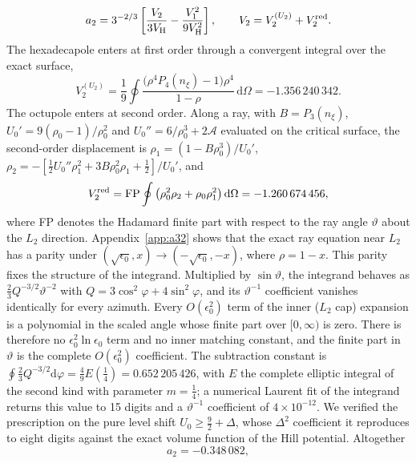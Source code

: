 \documentclass[twocolumn]{aastex702}
\newcommand{\dd}{\mathrm{d}}
\begin{document}
\begin{equation}
a_2=3^{-2/3}\left[\frac{V_2}{3V_{\rm H}}-\frac{V_1^2}{9V_{\rm H}^2}\right],\qquad V_2=V_2^{(U_2)}+V_2^{\rm red}.
\label{eq:a2}
\end{equation}
The hexadecapole enters at first order through a convergent integral over the exact surface,
\begin{equation}
V_2^{(U_2)}=\frac19\oint\frac{\big(\rho^4P_4(n_\xi)-1\big)\rho^4}{1-\rho}\,\dd\Omega=-1.356\,240\,342.
\end{equation}
The octupole enters at second order. Along a ray, with $B=P_3(n_\xi)$, $U_0'=9(\rho_0-1)/\rho_0^2$ and $U_0''=6/\rho_0^3+2\mathcal A$ evaluated on the critical surface, the second-order displacement is $\rho_1=(1-B\rho_0^3)/U_0'$, $\rho_2=-[\tfrac12U_0''\rho_1^2+3B\rho_0^2\rho_1+\tfrac12]/U_0'$, and
\begin{equation}
V_2^{\rm red}=\operatorname{FP}\oint\big(\rho_0^2\rho_2+\rho_0\rho_1^2\big)\,\dd\Omega=-1.260\,674\,456,
\label{eq:V2red}
\end{equation}
where FP denotes the Hadamard finite part with respect to the ray angle $\vartheta$ about the $L_2$ direction. Appendix~\ref{app:a32} shows that the exact ray equation near $L_2$ has a parity under $(\sqrt{\epsilon_0},x)\to(-\sqrt{\epsilon_0},-x)$, where $\rho=1-x$. This parity fixes the structure of the integrand. Multiplied by $\sin\vartheta$, the integrand behaves as $\tfrac23Q^{-3/2}\vartheta^{-2}$ with $Q=3\cos^2\varphi+4\sin^2\varphi$, and its $\vartheta^{-1}$ coefficient vanishes identically for every azimuth. Every $O(\epsilon_0^2)$ term of the inner ($L_2$ cap) expansion is a polynomial in the scaled angle whose finite part over $[0,\infty)$ is zero. There is therefore no $\epsilon_0^2\ln\epsilon_0$ term and no inner matching constant, and the finite part in $\vartheta$ is the complete $O(\epsilon_0^2)$ coefficient. The subtraction constant is $\oint\tfrac23Q^{-3/2}\dd\varphi=\tfrac49E(\tfrac14)=0.652\,205\,426$, with $E$ the complete elliptic integral of the second kind with parameter $m=\tfrac14$; a numerical Laurent fit of the integrand returns this value to 15 digits and a $\vartheta^{-1}$ coefficient of $4\times10^{-12}$. We verified the prescription on the pure level shift $U_0\ge\tfrac92+\Delta$, whose $\Delta^2$ coefficient it reproduces to eight digits against the exact volume function of the Hill potential. Altogether
\begin{equation}
a_2=-0.348\,082,
\end{equation}
\end{document}
